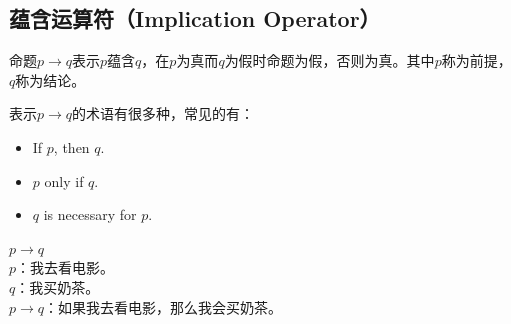 \documentclass[12pt, openany, oneside]{book}
\begin{document}
\subsection{蕴含运算符（Implication Operator）}

命题$ p \rightarrow q $表示$ p $蕴含$ q $，在$ p $为真而$ q $为假时命题为假，否则为真。其中$ p $称为前提，$ q $称为结论。

\begin{table}[H]
    \centering
    \caption{蕴含真值表}
\end{table}

表示$ p \rightarrow q $的术语有很多种，常见的有：

\begin{itemize}
    \item If $ p $, then $ q $.
    \item $ p $ only if $ q $.
    \item $ q $ is necessary for $ p $.
\end{itemize}

\begin{tcolorbox}
    $ p \rightarrow q $ \\
    $ p $：我去看电影。 \\
    $ q $：我买奶茶。 \\
    $ p \rightarrow q $：如果我去看电影，那么我会买奶茶。
\end{tcolorbox}
\end{document}
